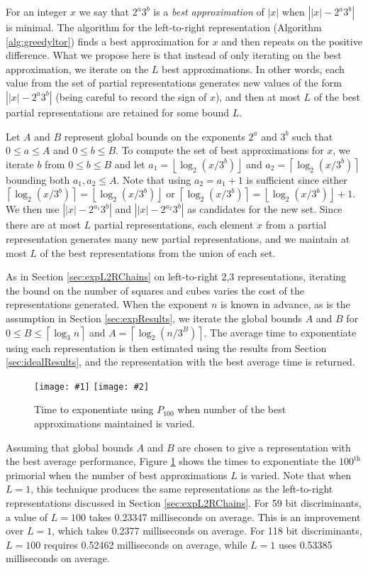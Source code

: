 \documentclass{ucalgthes1}
\theoremstyle{definition}
\newcommand{\floor}[1]{\left\lfloor #1 \right\rfloor}
\newcommand{\ceil}[1]{\left\lceil #1 \right\rceil}
\newcommand{\mygraphTwoX}[5]{
	\begin{figure}[htb]
	\centering
	\texttt{[image: \#1]}
	\texttt{[image: \#2]}
	\caption[#5]{#4}
	\label{#3}
	\end{figure}
}
\begin{document}
For an integer $x$ we say that $2^a3^b$ is a \emph{best approximation} of $|x|$ when $\left||x| - 2^a3^b \right|$ is minimal.  The algorithm for the left-to-right representation (Algorithm \ref{alg:greedyltor}) finds a best approximation for $x$ and then repeats on the positive difference.  What we propose here is that instead of only iterating on the best approximation, we iterate on the $L$ best approximations.  In other words, each value from the set of partial representations generates new values of the form $\left||x| - 2^a3^b\right|$ (being careful to record the sign of $x$), and then at most $L$ of the best partial representations are retained for some bound $L$.

Let $A$ and $B$ represent global bounds on the exponents $2^a$ and $3^b$ such that $0 \le a \le A$ and $0 \le b \le B$.  To compute the set of best approximations for $x$, we iterate $b$ from $0 \le b \le B$ and let $a_1 = \floor{\log_2 (x/3^b)}$ and $a_2 = \ceil{\log_2 (x/3^b)}$ bounding both $a_1, a_2 \le A$.  Note that using $a_2 = a_1 + 1$ is sufficient since either $\ceil{\log_2 (x/3^b)} = \floor{\log_2 (x/3^b)}$ or $\ceil{\log_2 (x/3^b)} = \floor{\log_2 (x/3^b)} + 1$.  We then use $\left||x|-2^{a_1}3^b\right|$ and $\left||x|-2^{a_2}3^b\right|$ as candidates for the new set.  Since there are at most $L$ partial representations, each element $x$ from a partial representation generates many new partial representations, and we maintain at most $L$ of the best representations from the union of each set.

As in Section \ref{sec:expL2RChains} on left-to-right 2,3 representations, iterating the bound on the number of squares and cubes varies the cost of the representations generated.  When the exponent $n$ is known in advance, as is the assumption in Section \ref{sec:expResults}, we iterate the global bounds $A$ and $B$ for $0 \le B \le \ceil{\log_3 n}$ and $A = \ceil{\log_2 (n/3^B)}$.  The average time to exponentiate using each representation is then estimated using the results from Section \ref{sec:idealResults}, and the representation with the best average time is returned.  

\mygraphTwoX{dbns_l2r_tree_vary-64}{dbns_l2r_tree_vary-128}{fig:expL2RBestVary}{Time to exponentiate using $P_{100}$ when number of the best approximations maintained is varied.}{Varying the Number of Best Approximations.}

Assuming that global bounds $A$ and $B$ are chosen to give a representation with the best average performance, Figure \ref{fig:expL2RBestVary} shows the times to exponentiate the $100^{\textrm{th}}$ primorial when the number of best approximations $L$ is varied.   Note that when $L=1$, this technique produces the same representations as the left-to-right representations discussed in Section \ref{sec:expL2RChains}.  For 59 bit discriminants, a value of $L=100$ takes 0.23347 milliseconds on average.  This is an improvement over $L=1$, which takes 0.2377 milliseconds on average.  For 118 bit discriminants, $L=100$ requires 0.52462 milliseconds on average, while $L=1$ uses 0.53385 milliseconds on average.
\end{document}
